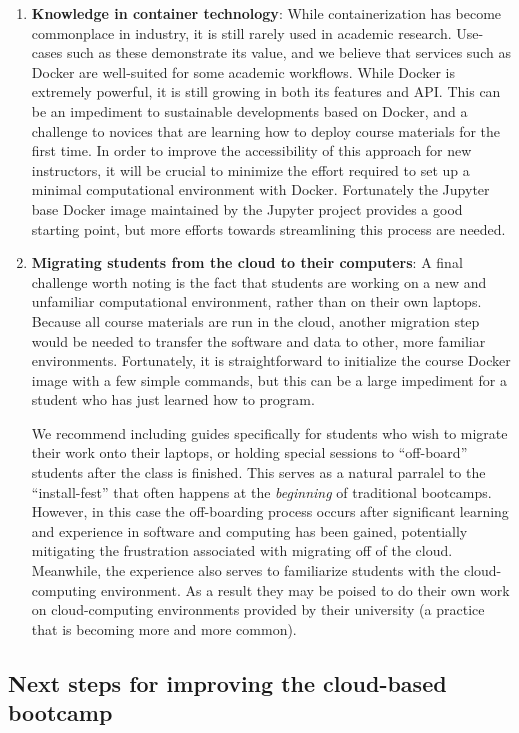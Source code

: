 \begin{enumerate}
\item {\bf Knowledge in container technology}: While containerization has become
commonplace in industry, it is still rarely used in academic research. Use-cases
such as these demonstrate its value, and we believe that services such as Docker
are well-suited for some academic workflows. While Docker is extremely powerful,
it is still growing in both its features and API. This can be an impediment to
sustainable developments based on Docker, and a challenge to novices that are
learning how to deploy course materials for the first time. In order to improve
the accessibility of this approach for new instructors, it will be crucial to
minimize the effort required to set up a minimal computational environment with
Docker. Fortunately the Jupyter base Docker image maintained by the Jupyter
project provides a good starting point, but more efforts towards streamlining
this process are needed.

\item {\bf Migrating students from the cloud to their computers}: A final
challenge worth noting is the fact that students are working on a new and
unfamiliar computational environment, rather than on their own laptops. Because
all course materials are run in the cloud, another migration step would be
needed to transfer the software and data to other, more familiar environments.
Fortunately, it is straightforward to initialize the course Docker image with a
few simple commands, but this can be a large impediment for a student who has
just learned how to program.

We recommend including guides specifically for
students who wish to migrate their work onto their laptops, or holding special
sessions to ``off-board'' students after the class is finished. This serves as a
natural parralel to the ``install-fest'' that often happens at the
\emph{beginning} of traditional bootcamps. However, in this case the
off-boarding process occurs after significant learning and experience in
software and computing has been gained, potentially mitigating the frustration
associated with migrating off of the cloud. Meanwhile, the experience also
serves to familiarize students with the cloud-computing environment. As a result
they may be poised to do their own work on cloud-computing environments
provided by their university (a practice that is becoming more and more common).

\end{enumerate}

\subsection{Next steps for improving the cloud-based bootcamp}

